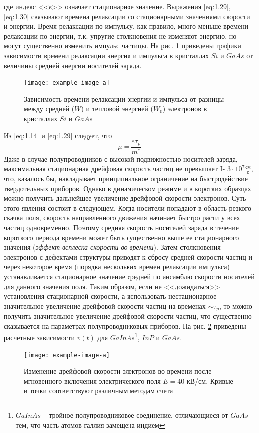 где индекс <<s>> означает стационарное значение. Выражения \eqref{eq:1.29}, \eqref{eq:1.30}
связывают времена релаксации со стационарными значениями скорости и энергии.
Время релаксации по импульсу, как правило, много меньше времени релаксации
по энергии, т.к. упругие столкновения не изменяют энергию, но могут существенно изменить импульс частицы. На рис. \ref{fig:5} приведены графики зависимости
времени релаксации энергии и импульса в кристаллах $Si$ и $GaAs$ от величины
средней энергии носителей заряда.
\begin{figure}[h!]
	\centering
	\texttt{[image: example-image-a]}
	\caption{Зависимость времени релаксации энергии и импульса от разницы между средней 
	($W$) и тепловой энергией ($W_0$) электронов в кристаллах $Si$ и $GaAs$}
	\label{fig:5}
\end{figure}
Из \eqref{eq:1.14} и \eqref{eq:1.29} следует, что 
\begin{equation}
\label{eq:1.31}
	\mu =\frac{e \tau_p}{m^*}
\end{equation}
Даже в случае полупроводников с высокой подвижностью носителей заряда,
максимальная стационарная дрейфовая скорость частиц не превышает I-
$3\cdot 10^7\frac{\text{см}}{\text{с}}$, что, казалось бы, накладывает принципиальное ограничение на быстродействие твердотельных приборов. Однако в динамическом режиме и в коротких образцах можно получить дальнейшее увеличение дрейфовой скорости электронов. Суть этого явления состоит в следующем. Когда носители попадают в
область резкого скачка поля, скорость направленного движения начинает быстро
расти у всех частиц одновременно. Поэтому средняя скорость носителей заряда в
течение короткого периода времени может быть существенно выше ее стационарного значения (\textit{эффект всплеска скорости во времени}). Затем столкновения электронов с дефектами структуры приводят к сбросу средней скорости частиц и через некоторое время (порядка нескольких времен релаксации импульса) устанавливается стационарное значение средней по ансамблю скорости носителей для данного значения поля. Таким образом, если не <<дожидаться>>
установления стационарной скорости, а использовать нестационарное значительное увеличение дрейфовой скорости частиц на временах $\sim \tau_p$, то можно получить значительное увеличение дрейфовой скорости частиц, что существенно сказывается на параметрах полупроводниковых приборов. На рис. \ref{fig:6} приведены расчетные зависимости $v(t)$ для 
$GaInAs$\footnote{$GaInAs$ -- тройное полупроводниковое соединение, отличающиеся от $GaAs$ тем, что часть атомов галлия замещена индием}, $InP$  и $GaAs$.
\begin{figure}[h!]
	\centering
	\texttt{[image: example-image-a]}
	\caption{Изменение дрейфовой скорости электронов во времени после мгновенного включения электрического поля $E=40$ кВ/см. Кривые и точки соответствуют различным методам счета \cite{lit6}}
	\label{fig:6}
\end{figure}

